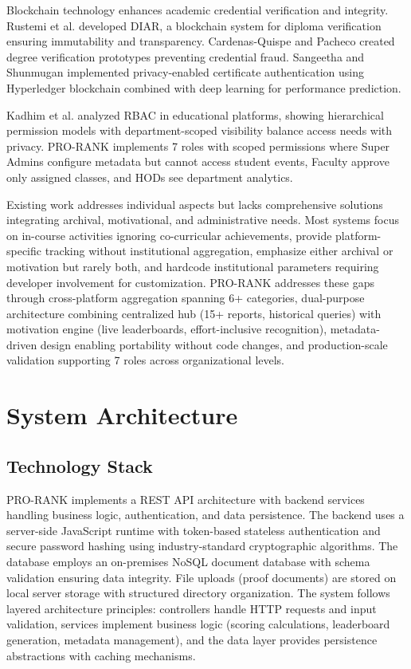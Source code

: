 \documentclass[conference]{IEEEtran}
\begin{document}
Blockchain technology enhances academic credential verification and integrity. Rustemi et al. \cite{rustemi2024} developed DIAR, a blockchain system for diploma verification ensuring immutability and transparency. Cardenas-Quispe and Pacheco \cite{cardenas2025} created degree verification prototypes preventing credential fraud. Sangeetha and Shunmugan \cite{sangeetha2025} implemented privacy-enabled certificate authentication using Hyperledger blockchain combined with deep learning for performance prediction.

Kadhim et al. \cite{kadhim2023} analyzed RBAC in educational platforms, showing hierarchical permission models with department-scoped visibility balance access needs with privacy. PRO-RANK implements 7 roles with scoped permissions where Super Admins configure metadata but cannot access student events, Faculty approve only assigned classes, and HODs see department analytics.

Existing work addresses individual aspects but lacks comprehensive solutions integrating archival, motivational, and administrative needs. Most systems focus on in-course activities ignoring co-curricular achievements, provide platform-specific tracking without institutional aggregation, emphasize either archival or motivation but rarely both, and hardcode institutional parameters requiring developer involvement for customization. PRO-RANK addresses these gaps through cross-platform aggregation spanning 6+ categories, dual-purpose architecture combining centralized hub (15+ reports, historical queries) with motivation engine (live leaderboards, effort-inclusive recognition), metadata-driven design enabling portability without code changes, and production-scale validation supporting 7 roles across organizational levels.

\section{System Architecture}

\subsection{Technology Stack}
PRO-RANK implements a REST API architecture with backend services handling business logic, authentication, and data persistence. The backend uses a server-side JavaScript runtime with token-based stateless authentication and secure password hashing using industry-standard cryptographic algorithms. The database employs an on-premises NoSQL document database with schema validation ensuring data integrity. File uploads (proof documents) are stored on local server storage with structured directory organization. The system follows layered architecture principles: controllers handle HTTP requests and input validation, services implement business logic (scoring calculations, leaderboard generation, metadata management), and the data layer provides persistence abstractions with caching mechanisms.
\end{document}
